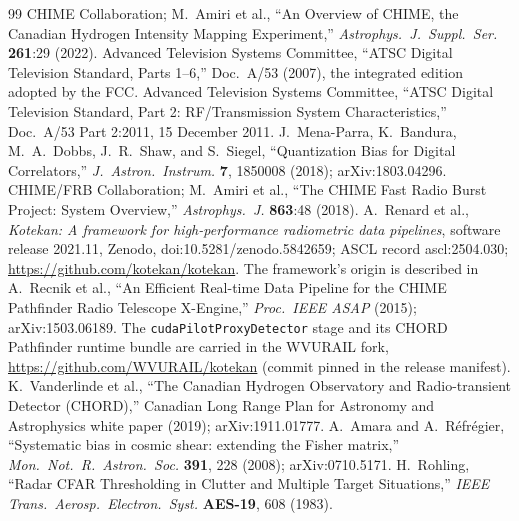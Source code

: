\begin{thebibliography}{99}
 CHIME Collaboration; M.~Amiri et al., ``An Overview of CHIME, the Canadian Hydrogen Intensity Mapping Experiment,'' \emph{Astrophys.\ J.\ Suppl.\ Ser.} \textbf{261}:29 (2022).
 Advanced Television Systems Committee, ``ATSC Digital Television Standard, Parts 1--6,'' Doc.\ A/53 (2007), the integrated edition adopted by the FCC.
 Advanced Television Systems Committee, ``ATSC Digital Television Standard, Part 2: RF/Transmission System Characteristics,'' Doc.\ A/53 Part 2:2011, 15 December 2011.
 J.~Mena-Parra, K.~Bandura, M.~A.~Dobbs, J.~R.~Shaw, and S.~Siegel, ``Quantization Bias for Digital Correlators,'' \emph{J.\ Astron.\ Instrum.} \textbf{7}, 1850008 (2018); arXiv:1803.04296.
 CHIME/FRB Collaboration; M.~Amiri et al., ``The CHIME Fast Radio Burst Project: System Overview,'' \emph{Astrophys.\ J.} \textbf{863}:48 (2018).
 A.~Renard et al., \emph{Kotekan: A framework for high-performance radiometric data pipelines}, software release 2021.11, Zenodo, doi:10.5281/zenodo.5842659; ASCL record ascl:2504.030; \url{https://github.com/kotekan/kotekan}. The framework's origin is described in A.~Recnik et al., ``An Efficient Real-time Data Pipeline for the CHIME Pathfinder Radio Telescope X-Engine,'' \emph{Proc.\ IEEE ASAP} (2015); arXiv:1503.06189. The \texttt{cudaPilotProxyDetector} stage and its CHORD Pathfinder runtime bundle are carried in the WVURAIL fork, \url{https://github.com/WVURAIL/kotekan} (commit pinned in the release manifest). 
 K.~Vanderlinde et al., ``The Canadian Hydrogen Observatory and Radio-transient Detector (CHORD),'' Canadian Long Range Plan for Astronomy and Astrophysics white paper (2019); arXiv:1911.01777.
 A.~Amara and A.~R\'efr\'egier, ``Systematic bias in cosmic shear: extending the Fisher matrix,'' \emph{Mon.\ Not.\ R.\ Astron.\ Soc.} \textbf{391}, 228 (2008); arXiv:0710.5171.
 H.~Rohling, ``Radar CFAR Thresholding in Clutter and Multiple Target Situations,'' \emph{IEEE Trans.\ Aerosp.\ Electron.\ Syst.} \textbf{AES-19}, 608 (1983).

\end{thebibliography}
